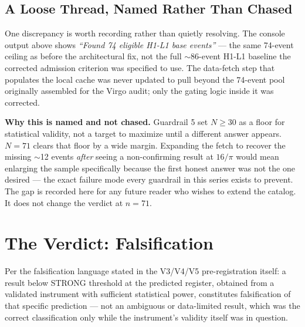 \documentclass[11pt, letterpaper, openany]{book}
\begin{document}
\subsection*{A Loose Thread, Named Rather Than Chased}

One discrepancy is worth recording rather than quietly resolving. The
console output above shows \textit{``Found 74 eligible H1-L1 base
events''} --- the same 74-event ceiling as before the architectural
fix, not the full $\sim$86-event H1-L1 baseline the corrected admission
criterion was specified to use. The data-fetch step that populates the
local cache was never updated to pull beyond the 74-event pool originally
assembled for the Virgo audit; only the gating logic inside it was
corrected.

\begin{warningbox}
\textbf{Why this is named and not chased.} Guardrail 5 set $N\geq30$ as
a floor for statistical validity, not a target to maximize until a
different answer appears. $N=71$ clears that floor by a wide margin.
Expanding the fetch to recover the missing $\sim$12 events \emph{after}
seeing a non-confirming result at $16/\pi$ would mean enlarging the
sample specifically because the first honest answer was not the one
desired --- the exact failure mode every guardrail in this series exists
to prevent. The gap is recorded here for any future reader who wishes to
extend the catalog. It does not change the verdict at $n=71$.
\end{warningbox}

\section{The Verdict: Falsification}

Per the falsification language stated in the V3/V4/V5 pre-registration
itself: a result below STRONG threshold at the predicted register,
obtained from a validated instrument with sufficient statistical power,
constitutes falsification of that specific prediction --- not an
ambiguous or data-limited result, which was the correct classification
only while the instrument's validity itself was in question.
\end{document}
